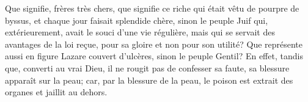 Que signifie, frères très chers,
	que signifie ce riche qui était vêtu de pourpre de byssus,
	et chaque jour faisait splendide chère,
	sinon le peuple Juif
	qui, extérieurement, avait le souci d’une vie régulière,
	mais qui se servait des avantages de la loi reçue,
	pour sa gloire et non pour son utilité?
Que représente aussi en figure Lazare couvert d’ulcères,
	sinon le peuple Gentil?
En effet, tandis que, converti au vrai Dieu,
	il ne rougit pas de confesser sa faute,
	sa blessure apparaît sur la peau;
	car, par la blessure de la peau,
	le poison est extrait des organes et jaillit au dehors.
